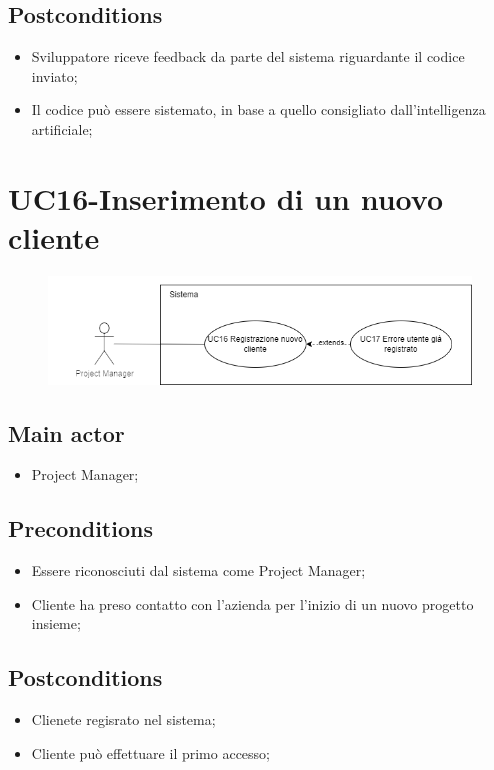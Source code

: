 \documentclass{article}
\begin{document}
    \subsection*{Postconditions}
        \begin{itemize}
            \item Sviluppatore riceve feedback da parte del sistema riguardante il codice inviato;
            \item Il codice può essere sistemato, in base a quello consigliato dall'intelligenza artificiale;
        \end{itemize}
    

        
\section{UC16-Inserimento di un nuovo cliente}
    \begin{figure}[h]
      \centering
      \includegraphics{./imgUML/UC16.png}
      \label{fig:immagine}
    \end{figure}
    
    \subsection*{Main actor}
        \begin{itemize}
            \item Project Manager;
        \end{itemize}
        
    \subsection*{Preconditions}
        \begin{itemize}
            \item Essere riconosciuti dal sistema come Project Manager;
            \item Cliente ha preso contatto con l'azienda per l'inizio di un nuovo progetto insieme;
        \end{itemize}
        
    \subsection*{Postconditions}
        \begin{itemize}
            \item Clienete regisrato nel sistema;
            \item Cliente può effettuare il primo accesso;
        \end{itemize}
    
\end{document}
